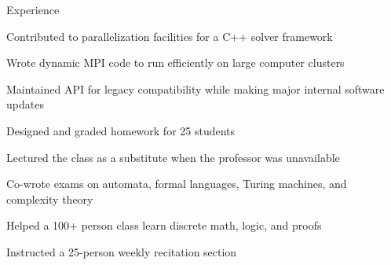 \documentclass{cv}
\begin{document}

\begin{cvsection}{Experience}
  {
    \item Contributed to parallelization facilities for a C++ solver framework
    \item Wrote dynamic MPI code to run efficiently on large computer clusters
    \item Maintained API for legacy compatibility while making major internal software updates
  }
  {
    \item Designed and graded homework for 25 students
    \item Lectured the class as a substitute when the professor was unavailable
    \item Co-wrote exams on automata, formal languages, Turing machines, and complexity theory
  }
  {
    \item Helped a 100+ person class learn discrete math, logic, and proofs
    \item Instructed a 25-person weekly recitation section
  }
\end{cvsection}
\end{document}

